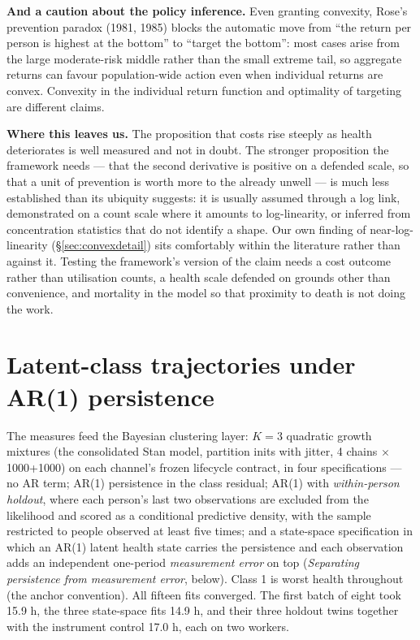 \documentclass[11pt]{article}
\begin{document}
\textbf{And a caution about the policy inference.} Even granting convexity,
Rose's prevention paradox (1981, 1985) blocks the automatic move from ``the
return per person is highest at the bottom'' to ``target the bottom'': most
cases arise from the large moderate-risk middle rather than the small extreme
tail, so aggregate returns can favour population-wide action even when
individual returns are convex. Convexity in the individual return function
and optimality of targeting are different claims.

\textbf{Where this leaves us.} The proposition that costs rise steeply as
health deteriorates is well measured and not in doubt. The stronger
proposition the framework needs --- that the second derivative is positive on
a defended scale, so that a unit of prevention is worth more to the already
unwell --- is much less established than its ubiquity suggests: it is usually
assumed through a log link, demonstrated on a count scale where it amounts to
log-linearity, or inferred from concentration statistics that do not identify
a shape. Our own finding of near-log-linearity
(\S\ref{sec:convexdetail}) sits comfortably within the literature rather than
against it. Testing the framework's version of the claim needs a cost outcome
rather than utilisation counts, a health scale defended on grounds other than
convenience, and mortality in the model so that proximity to death is not
doing the work.

\section{Latent-class trajectories under AR(1) persistence}
\label{sec:ar1}

The measures feed the Bayesian clustering layer: $K=3$ quadratic growth
mixtures (the consolidated Stan model, partition inits with jitter, 4 chains
$\times$ 1000+1000) on each channel's frozen lifecycle contract, in four
specifications --- no AR term; AR(1) persistence in the class residual; AR(1)
with \emph{within-person holdout}, where each person's last two observations
are excluded from the likelihood and scored as a conditional predictive
density, with the sample restricted to people observed at least five times;
and a state-space specification in which an AR(1) latent health state carries
the persistence and each observation adds an independent one-period
\emph{measurement error} on top (\emph{Separating persistence from
measurement error}, below). Class 1 is worst health
throughout (the anchor convention). All fifteen fits converged. The first
batch of eight took 15.9 h, the three state-space fits 14.9 h, and their three
holdout twins together with the instrument control 17.0 h, each on two
workers.
\end{document}
